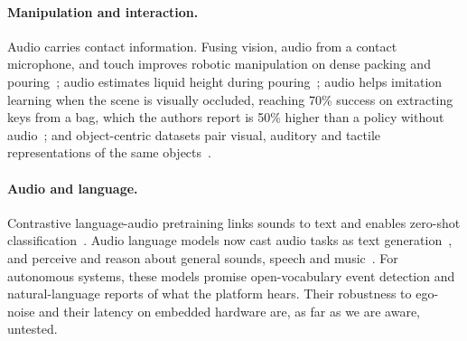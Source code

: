 \paragraph{Manipulation and interaction.}
Audio carries contact information.
Fusing vision, audio from a contact microphone, and touch improves robotic manipulation on dense packing and pouring~\cite{li2022seehearfeel}; audio estimates liquid height during pouring~\cite{liang2019pouring}; audio helps imitation learning when the scene is visually occluded, reaching 70\% success on extracting keys from a bag, which the authors report is 50\% higher than a policy without audio~\cite{du2022playitbyear}; and object-centric datasets pair visual, auditory and tactile representations of the same objects~\cite{gao2021objectfolder}.

\paragraph{Audio and language.}
Contrastive language-audio pretraining links sounds to text and enables zero-shot classification~\cite{elizalde2023clap}.
Audio language models now cast audio tasks as text generation~\cite{deshmukh2023pengi}, and perceive and reason about general sounds, speech and music~\cite{gong2024ltu,tang2024salmonn}.
For autonomous systems, these models promise open-vocabulary event detection and natural-language reports of what the platform hears.
Their robustness to ego-noise and their latency on embedded hardware are, as far as we are aware, untested.

